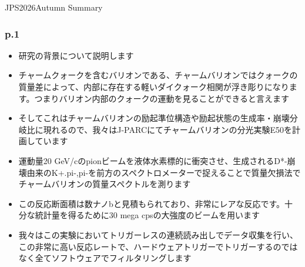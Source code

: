 \documentclass[12pt,a4paper,upLaTeX]{jsarticle}
\begin{document}
\fancyhf{}
\setlength{\headheight}{60pt}   %

\setlength{\footskip}{20pt}

\fancyfoot[R]{\thepage}

\vspace{50pt}
\begin{center}
{\gt \Large JPS2026Autumn Summary }\\[14pt]

\end{center}

\vspace{10pt}

\subsubsection*{p.1}
\begin{itemize}
\item 研究の背景について説明します
\item チャームクォークを含むバリオンである、チャームバリオンではクォークの質量差によって、内部に存在する軽いダイクォーク相関が浮き彫りになります。つまりバリオン内部のクォークの運動を見ることができると言えます
\item そしてこれはチャームバリオンの励起準位構造や励起状態の生成率・崩壊分岐比に現れるので、我々はJ-PARCにてチャームバリオンの分光実験E50を計画しています
\item 運動量20 GeV/cのpionビームを液体水素標的に衝突させ、生成されるD*-崩壊由来のK+.pi-,pi-を前方のスペクトロメーターで捉えることで質量欠損法でチャームバリオンの質量スペクトルを測ります
\item この反応断面積は数ナノbと見積もられており、非常にレアな反応です。十分な統計量を得るために30 mega cpsの大強度のビームを用います
\item 我々はこの実験においてトリガーレスの連続読み出しでデータ収集を行い、この非常に高い反応レートで、ハードウェアトリガーでトリガーするのではなく全てソフトウェアでフィルタリングします
\end{itemize}
\end{document}
